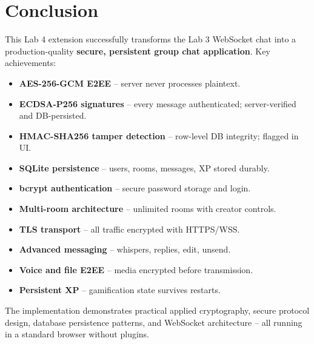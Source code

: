 \documentclass[12pt, a4paper]{article}
\begin{document}
\section{Conclusion}

This Lab 4 extension successfully transforms the Lab 3 WebSocket chat into a production-quality \textbf{secure, persistent group chat application}. Key achievements:

\begin{itemize}[leftmargin=*]
    \item[\checkmark] \textbf{AES-256-GCM E2EE} -- server never processes plaintext.
    \item[\checkmark] \textbf{ECDSA-P256 signatures} -- every message authenticated; server-verified and DB-persisted.
    \item[\checkmark] \textbf{HMAC-SHA256 tamper detection} -- row-level DB integrity; flagged in UI.
    \item[\checkmark] \textbf{SQLite persistence} -- users, rooms, messages, XP stored durably.
    \item[\checkmark] \textbf{bcrypt authentication} -- secure password storage and login.
    \item[\checkmark] \textbf{Multi-room architecture} -- unlimited rooms with creator controls.
    \item[\checkmark] \textbf{TLS transport} -- all traffic encrypted with HTTPS/WSS.
    \item[\checkmark] \textbf{Advanced messaging} -- whispers, replies, edit, unsend.
    \item[\checkmark] \textbf{Voice and file E2EE} -- media encrypted before transmission.
    \item[\checkmark] \textbf{Persistent XP} -- gamification state survives restarts.
\end{itemize}

The implementation demonstrates practical applied cryptography, secure protocol design, database persistence patterns, and WebSocket architecture -- all running in a standard browser without plugins.





\end{document}
